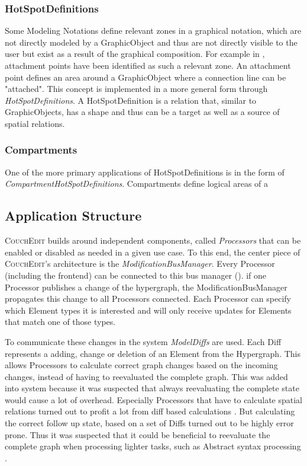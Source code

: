 \subsubsection{HotSpotDefinitions}
Some Modeling Notations define relevant zones in a graphical notation, which are not directly modeled by a GraphicObject and thus are not directly visible to the user but exist as a result of the graphical composition. For example in \cite{bottoni_suite_2004}, attachment points have been identified as such a relevant zone. An attachment point defines an area around a GraphicObject where a connection line can be "attached". This concept is implemented in a more general form through \emph{HotSpotDefinitions}. A HotSpotDefinition is a relation that, similar to GraphicObjects, has a shape and thus can be a target as well as a source of spatial relations.

\subsubsection*{Compartments}
\label{sec:compartments}
One of the more primary applications of HotSpotDefinitions is in the form of \emph{CompartmentHotSpotDefinitions}. Compartments define logical areas of a 


\subsection{Application Structure}
\textsc{CouchEdit} builds around independent components, called \emph{Processors} that can be enabled or disabled as needed in a given use case. To this end, the center piece of \textsc{CouchEdit}'s architecture is the \emph{ModificationBusManager}. Every Processor (including the frontend) can be connected to this bus manager (). if one Processor publishes a change of the hypergraph, the ModificationBusManager propagates this change to all Processors connected. Each Processor can specify which Element types it is interested and will only receive updates for Elements that match one of those types. 

To communicate these changes in the system \emph{ModelDiffs} are used. Each Diff represents a adding, change or deletion of an Element from the Hypergraph. This allows Processors to calculate correct graph changes based on the incoming changes, instead of having to reevaluated the complete graph. This was added into system because it was suspected that always reevaluating the complete state would cause a lot of overhead. Especially Processors that have to calculate spatial relations turned out to profit a lot from diff based calculations \cite{nachreiner_couchedit_2020}. But calculating the correct follow up state, based on a set of Diffs turned out to be highly error prone. Thus it was suspected that it could be beneficial to reevaluate the complete graph when processing lighter tasks, such as Abstract syntax processing \cite{nachreiner_couchedit_2020}.

